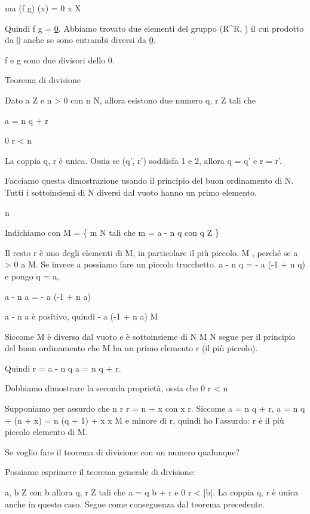 ma (f \cdot g) (x) = 0 \forall x \in X

Quindi f \cdot g = \underline{0}. Abbiamo trovato due elementi del gruppo (R^R, \cdot) il cui prodotto da \underline{0} anche se sono entrambi diversi da \underline{0}.

f e g sono due divisori dello 0.

Teorema di divisione

Dato a \in Z e n > 0 con n \in N, allora esistono due numero q, r \in Z tali che
\begin{description}
    \item a = n \cdot q + r
    \item 0 \le r < n
\end{description}
La coppia q, r \`e unica. Ossia se (q', r') soddisfa 1 e 2, allora q = q' e r = r'.

Facciamo questa dimostrazione usando il principio del buon ordinamento di N. Tutti i sottoinsiemi di N diversi dal vuoto hanno un primo elemento.

n 

Indichiamo con M = \{ m \in N tali che m = a - n \cdot q con q \in Z \}

Il resto r \`e uno degli elementi di M, in particolare il pi\`u piccolo. M \neq \emptyset, perch\'e se a > 0 \Rightarrow a \in M. Se invece a  \Rightarrow possiamo fare un piccolo trucchetto. a - n \cdot q = - a \cdot (-1 + n \cdot q) e pongo q = a,

a - n \cdot a = - a \cdot (-1 + n \cdot a)

a - n \cdot a \`e positivo, quindi - a \cdot (-1 + n a) \in M

Siccome M \`e diverso dal vuoto e \`e sottoinsieme di N
M \subseteq N
segue per il principio del buon ordinamento che M ha un primo elemento r (il pi\`u piccolo).

Quindi r = a - n q \Rightarrow a = n q + r.

Dobbiamo dimostrare la seconda propriet\`a, ossia che 0 \le r < n

Supponiamo per assurdo che n \le r \Rightarrow r = n + x con x \le r. Siccome a = n q + r, a = n q + (n + x) = n (q + 1) + x \Rightarrow x \in M e minore di r, quindi ho l'assurdo: r \`e il pi\`u piccolo elemento di M.

Se voglio fare il teorema di divisione con un numero qualunque?

Possiamo esprimere il teorema generale di divisione:

a, b \in Z con b  allora \exist q, r \in Z tali che a = q b + r e 0 \le r < |b|. La coppia q, r \`e unica anche in questo caso. Segue come conseguenza dal teorema precedente. 


